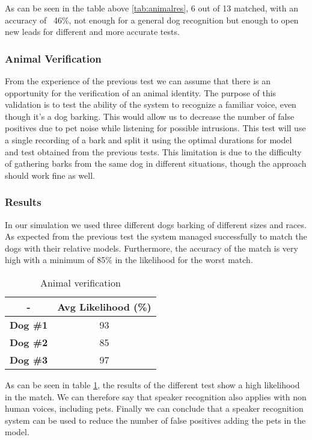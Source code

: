 As can be seen in the table above \ref{tab:animalres}, 6 out of 13 matched, with an accuracy of
~46\%, not enough for a general dog recognition but enough to open new leads for different and more
accurate tests.

\subsubsection{Animal Verification}

From the experience of the previous test we can assume that there is an opportunity
for the verification of an animal identity. The purpose of this validation is to
test the ability of the system to recognize a familiar voice, even though it's a dog
barking. This would allow us to decrease the number of false positives due to pet
noise while listening for possible intrusions. \newline
This test will use a single recording of a bark and split it using the optimal
durations for model and test obtained from the previous tests.
This limitation is due to the difficulty of gathering
barks from the same dog in different situations, though the approach should work fine as well.

\subsubsection{Results}

In our simulation we used three different dogs barking of different
sizes and races. As expected from the previous test the system
managed successfully to match the dogs with their relative models. Furthermore,
the accuracy of the match is very high with a minimum of 85\% in the likelihood
for the worst match.

\begin{table}

\centering
\caption{Animal verification}
\label{tab:animalresver}
\begin{tabular}{|c|c|} \hline
    - & \textbf{Avg Likelihood (\%)} \\ \hline
    \textbf{Dog \#1} & 93 \\ \hline
    \textbf{Dog \#2} & 85 \\ \hline
    \textbf{Dog \#3} & 97 \\ \hline
\end{tabular}
\end{table}

As can be seen in table \ref{tab:animalresver}, the results of the different test
show a high likelihood in the match. We can therefore say that speaker recognition
also applies with non human voices, including pets.\newline
Finally we can conclude that a speaker recognition system can be used to reduce the number
of false positives adding the pets in the model.


